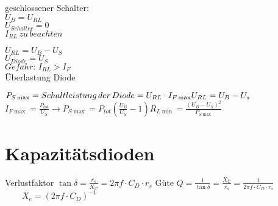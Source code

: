     \begin{minipage}{0.2\columnwidth}
        geschlossener Schalter:\\
        $U_B=U_{RL}$\\
        $U_{Schalter}=0$\\
        $I_{RL}\, zu\, beachten$
    \end{minipage}
    \begin{minipage}{0.5\columnwidth}
    \end{minipage}
    \begin{minipage}{0.3\columnwidth}
        $U_{RL}=U_B-U_S$\\
        $U_{Diode}=U_S$\\
        $Gefahr:\, I_{RL}>I_F$\\
        Überlastung Diode
    \end{minipage}

    $P_{S\max}=Schaltleistung\, der\, Diode=U_{RL}\cdot I_{F\max}\\
    U_{RL}=U_B-U_s$\hspace*{1cm}$I_{F\max}=\frac{P_{tot}}{U_S}\longrightarrow P_{S\max}=P_{tot}(\frac{U_B}{U_S}-1)$\hspace*{1cm}$R_{L\min}=\frac{(U_B-U_S)^2}{P_{S\max}}$

    \section{Kapazitätsdioden}
    \begin{minipage}{0.3\columnwidth}
    \end{minipage}
    \begin{minipage}{0.6\columnwidth}
        Verlustfaktor $\tan\delta=\frac{r_s}{X_C}=2\pi f\cdot C_D\cdot r_s$ Güte $Q=\frac{1}{\tan\delta}=\frac{X_C}{r_s}=\frac{1}{2\pi f\cdot C_D\cdot r_s}$\\
        $\quad\quad X_e=(2\pi f\cdot C_D)^{-1}$\\
        
    \end{minipage}


